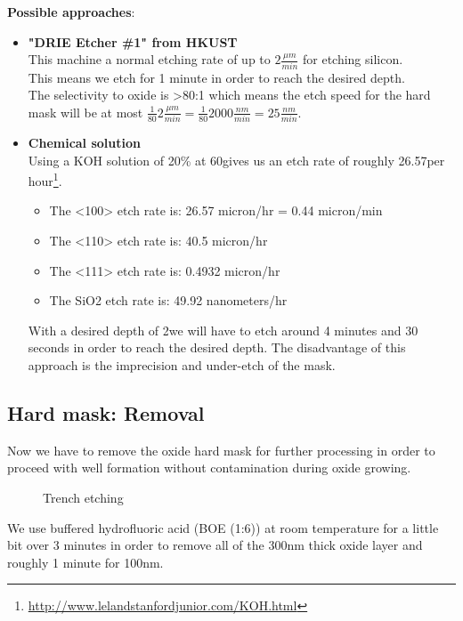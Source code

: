 \textbf{Possible approaches}:
\begin{itemize}
\item \textbf{"DRIE Etcher \#1" from HKUST} \\
This machine a normal etching rate of up to $2\frac{\mu m}{min}$ for etching silicon. \\
This means we etch for 1 minute in order to reach the desired depth. \\
The selectivity to oxide is >80:1 which means the etch speed for the hard mask will be at most $\frac{1}{80}2\frac{\mu m}{min}=\frac{1}{80}2000\frac{nm}{min}=25\frac{nm}{min}$.
\item \textbf{Chemical solution} \\
Using a KOH solution of 20\% at 60\degreesC gives us an etch rate of roughly  26.57\um per hour\footnote{\url{http://www.lelandstanfordjunior.com/KOH.html}}.
\begin{itemize}
\item The <100> etch rate is: 26.57 micron/hr = 0.44 micron/min
\item The <110> etch rate is: 40.5 micron/hr 
\item The <111> etch rate is: 0.4932 micron/hr 
\item The SiO2 etch rate is: 49.92 nanometers/hr 
\end{itemize}
With a desired depth of 2\um we will have to etch around 4 minutes and 30 seconds in order to reach the desired depth.
The disadvantage of this approach is the imprecision and under-etch of the mask.
\end{itemize}

\subsection{Hard mask: Removal}

Now we have to remove the oxide hard mask for further processing in order to proceed with well formation without contamination during oxide growing.

\begin{figure}[H]
	\centering
	\begin{tikzpicture}[node distance = 3cm, auto, thick,scale=\CrossSectionOnly, every node/.style={transform shape}]
		
	\end{tikzpicture}
	\drawStepArrow{}
	\begin{tikzpicture}[node distance = 3cm, auto, thick,scale=\CrossSectionOnly, every node/.style={transform shape}]
		
	\end{tikzpicture}
	\caption{Trench etching}
\end{figure}

We use buffered hydrofluoric acid (BOE (1:6)) at room temperature for a little bit over 3 minutes in order to remove all of the 300nm thick oxide layer and roughly 1 minute for 100nm.

